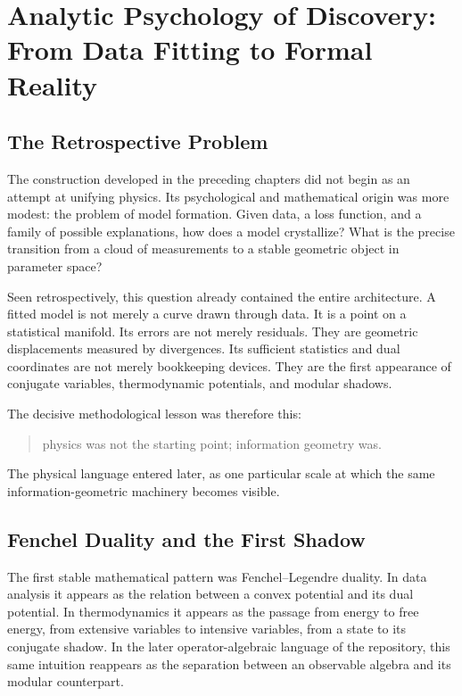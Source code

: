 \chapter{Analytic Psychology of Discovery: From Data Fitting to Formal Reality}
\label{chap:analytic-psychology-origin}

\section{The Retrospective Problem}

The construction developed in the preceding chapters did not begin as an attempt
at unifying physics.  Its psychological and mathematical origin was more modest:
the problem of model formation.  Given data, a loss function, and a family of
possible explanations, how does a model crystallize?  What is the precise
transition from a cloud of measurements to a stable geometric object in parameter
space?

Seen retrospectively, this question already contained the entire architecture.
A fitted model is not merely a curve drawn through data.  It is a point on a
statistical manifold.  Its errors are not merely residuals.  They are geometric
displacements measured by divergences.  Its sufficient statistics and dual
coordinates are not merely bookkeeping devices.  They are the first appearance
of conjugate variables, thermodynamic potentials, and modular shadows.

The decisive methodological lesson was therefore this:
\begin{quote}
  physics was not the starting point; information geometry was.
\end{quote}

The physical language entered later, as one particular scale at which the same
information-geometric machinery becomes visible.

\section{Fenchel Duality and the First Shadow}

The first stable mathematical pattern was Fenchel--Legendre duality.  In data
analysis it appears as the relation between a convex potential and its dual
potential.  In thermodynamics it appears as the passage from energy to free
energy, from extensive variables to intensive variables, from a state to its
conjugate shadow.  In the later operator-algebraic language of the repository,
this same intuition reappears as the separation between an observable algebra
and its modular counterpart.

